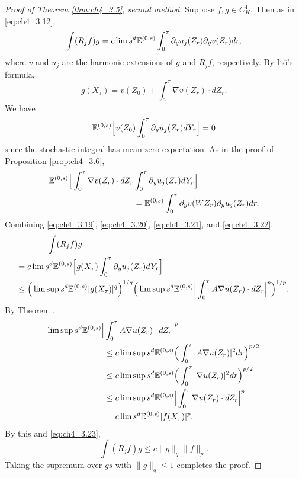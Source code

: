 \begin{proof}[Proof of Theorem \ref{thm:ch4_3.5}, second method]
{\hspace{-0.6em} Suppose $f,g \in C_K^1$.\hspace{-0.2em} Then as in \eqref{eq:ch4_3.12},}
\begin{equation}\label{eq:ch4_3.19}
    \int(R_j f)g = c\lim s^d\mathbb{E}^{(0,s)} \int_0^{\tau} \partial_y u_j(Z_r)\partial_y v(Z_r)dr,
\end{equation}
where $v$ and $u_j$ are the harmonic extensions of $g$ and $R_j f$, respectively. By It\^o's formula,
\begin{equation}\label{eq:ch4_3.20}
    g(X_\tau) = v(Z_0) + \int_0^{\tau} \nabla v(Z_r)\cdot dZ_r.
\end{equation}
We have
\begin{equation}\label{eq:ch4_3.21}
    \mathbb{E}^{(0,s)}\Big[v(Z_0)\int_0^{\tau} \partial_y u_j(Z_r)dY_r\Big] = 0
\end{equation}
since the stochastic integral has mean zero expectation. As in the proof of Proposition \ref{prop:ch4_3.6},
\begin{align}\label{eq:ch4_3.22}
    \mathbb{E}^{(0,s)}\Big[\int_0^{\tau} \nabla v(Z_r)\cdot dZ_r &\int_0^{\tau} \partial_y u_j(Z_r)dY_r\Big] \\
    &= \mathbb{E}^{(0,s)} \int_0^{\tau} \partial_y v(WZ_r)\partial_y u_j(Z_r)dr. \notag
\end{align}
Combining \eqref{eq:ch4_3.19}, \eqref{eq:ch4_3.20}, \eqref{eq:ch4_3.21}, and \eqref{eq:ch4_3.22},
\begin{align}\label{eq:ch4_3.23}
    \raisetag{-1.3\baselineskip}
    &\hspace{3.4em}\int(R_j f)g \\
    &\hspace{-0.3em}= c\lim s^d\E^{(0,s)}\Big[g(X_\tau)\int_0^{\tau} \partial_y u_j(Z_r)dY_r\Big] \notag \\
    &\hspace{-0.3em}\leq \Big(\limsup s^d\E^{(0,s)}|g(X_\tau)|^q\Big)^{1/q}\Big(\limsup s^d\E^{(0,s)}\Big|\int_0^{\tau} A\nabla u(Z_r)\cdot dZ_r\Big|^p\Big)^{1/p}. \notag
\end{align}
By Theorem ,
\begin{align*}
    \limsup s^d\mathbb{E}^{(0,s)}\Big|&\int_0^{\tau} A\nabla u(Z_r)\cdot dZ_r\Big|^p \\
    &\leq c\limsup s^d\mathbb{E}^{(0,s)}\Big(\int_0^{\tau} |A\nabla u(Z_r)|^2dr\Big)^{p/2} \\
    &\leq c\limsup s^d\mathbb{E}^{(0,s)}\Big(\int_0^{\tau} |\nabla u(Z_r)|^2dr\Big)^{p/2} \\
    &\leq c\limsup s^d\mathbb{E}^{(0,s)}\Big|\int_0^{\tau} \nabla u(Z_r)\cdot dZ_r\Big|^p \\
    &= c\lim s^d\mathbb{E}^{(0,s)}|f(X_\tau)|^p.
\end{align*}
By this and \eqref{eq:ch4_3.23},
\[
    \int(R_j f)g \leq c\|g\|_q\|f\|_p.
\]
Taking the supremum over $gs$ with $\|g\|_q \leq 1$ completes the proof.
\end{proof}

